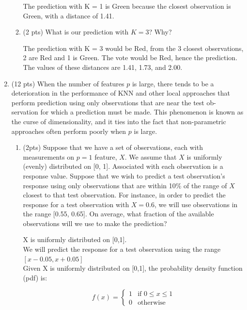 \documentclass[a4paper]{article}
\theoremstyle{definition}
\newenvironment{soln}{
    \leavevmode\color{blue}\ignorespaces
}{}
\begin{document}
\begin{enumerate}
\begin{enumerate}
	\begin{soln}  The prediction with K = 1 is Green because the closest observation is Green, with a distance of 1.41. \end{soln}
	
	\item (2 pts) What is our prediction with $K=3$? Why?
	
	\begin{soln}  The prediction with K = 3 would be Red, from the 3 closest observations, 2 are Red and 1 is Green. The vote would be Red, hence the prediction. The values of these distances are 1.41, 1.73, and 2.00. \end{soln}

\end{enumerate}

\item (12 pts) When the number of features $p$ is large, there tends to be a deterioration in the performance of KNN and other local approaches that perform prediction using only observations that are near the test ob- servation for which a prediction must be made. This phenomenon is known as the curse of dimensionality, and it ties into the fact that non-parametric approaches often perform poorly when $p$ is large.

\begin{enumerate}
	\item (2pts) Suppose that we have a set of observations, each with measurements on $p=1$ feature, $X$. We assume that $X$ is uniformly (evenly) distributed on [0, 1]. Associated with each observation is a response value. Suppose that we wish to predict a test observation’s response using only observations that are within 10\% of the range of $X$ closest to that test observation. For instance, in order to predict the response for a test observation with $X=0.6$, we will use observations in the range [0.55, 0.65]. On average, what fraction of the available observations will we use to make the prediction?
	
	\begin{soln}  
		X is uniformly distributed on [0,1].\\
		We will predict the response for a test observation using the range $[x - 0.05, x + 0.05]$\\
		Given X is uniformly distributed on [0,1], the probability density function (pdf) is:
		
		$$
		f(x) = \begin{cases}
		1 & \text{if } 0 \leq x \leq 1 \\
		0 & \text{otherwise}
		\end{cases}
		$$
		

\end{soln}
\end{enumerate}
\end{enumerate}
\end{document}
